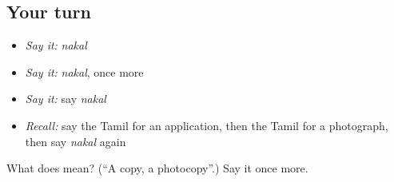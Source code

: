 \subsection*{Your turn}
\begin{itemize}
\raggedright
  \item \emph{Say it:} \emph{nakal}
  \item \emph{Say it:} \emph{nakal}, once more
  \item \emph{Say it:} say \emph{nakal}
  \item \emph{Recall:} say the Tamil for an application, then the Tamil for a photograph, then say \emph{nakal} again
\end{itemize}

\begin{tcolorbox}[breakable,colback=teal!4,colframe=teal!35!black,title={Before you move on}]
What does  mean? (\textquotedblleft{}A copy, a photocopy\textquotedblright{}.) Say it once more.
\end{tcolorbox}

